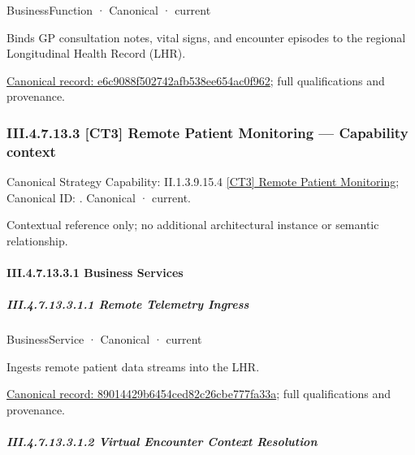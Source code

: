\label{element:e6c9088f502742afb538ee654ac0f962}
{\small BusinessFunction · Canonical · current}\par

Binds GP consultation notes, vital signs, and encounter episodes to the regional Longitudinal Health Record (LHR).


{\footnotesize \href{../../../../continuum/business/business-function/e6c9088f502742afb538ee654ac0f962.md}{Canonical record: e6c9088f502742afb538ee654ac0f962}; full qualifications and provenance.}\par
\subsubsection*{III.4.7.13.3 [CT3] Remote Patient Monitoring — Capability context}
\label{navigation:III.4.7.13.3}

{\small Canonical Strategy Capability: II.1.3.9.15.4 \hyperref[element:2d1addc7dd1d4821b71a11c692d35b27]{[CT3] Remote Patient Monitoring}; Canonical ID: \texttt{}. Canonical · current.}\par
Contextual reference only; no additional architectural instance or semantic relationship.\par
\paragraph*{III.4.7.13.3.1 Business Services}
\label{navigation:III.4.7.13.3.1}

\subparagraph*{III.4.7.13.3.1.1 Remote Telemetry Ingress}
\label{navigation:III.4.7.13.3.1.1}

\label{element:89014429b6454ced82c26cbe777fa33a}
{\small BusinessService · Canonical · current}\par

Ingests remote patient data streams into the LHR.


{\footnotesize \href{../../../../continuum/business/business-service/89014429b6454ced82c26cbe777fa33a.md}{Canonical record: 89014429b6454ced82c26cbe777fa33a}; full qualifications and provenance.}\par
\subparagraph*{III.4.7.13.3.1.2 Virtual Encounter Context Resolution}
\label{navigation:III.4.7.13.3.1.2}


